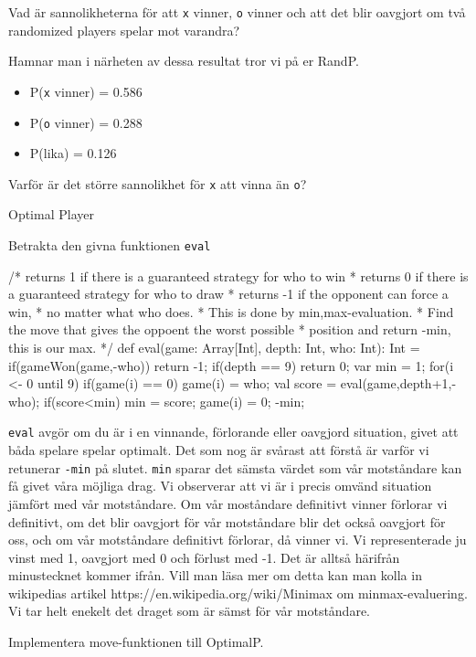 \Subtask Vad är sannolikheterna för att \texttt{x} vinner, \texttt{o} vinner och att det blir oavgjort om två randomized players spelar mot varandra?

Hamnar man i närheten av dessa resultat tror vi på er RandP.
\begin{itemize}
	\item P(\texttt{x} vinner) = 0.586
	\item P(\texttt{o} vinner) = 0.288
	\item P(lika) = 0.126
\end{itemize}

\Subtask Varför är det större sannolikhet för \texttt{x} att vinna än \texttt{o}?

\Task Optimal Player

Betrakta den givna funktionen \texttt{eval}
\begin{Code}
/* returns 1 if there is a guaranteed strategy for who to win 
 * returns 0 if there is a guaranteed strategy for who to draw 
 * returns -1 if the opponent can force a win,
 * no matter what who does.
 * This is done by min,max-evaluation. 
 * Find the move that gives the oppoent the worst possible
 * position and return -min, this is our max.
 */
def eval(game: Array[Int], depth: Int, who: Int): Int = {
	if(gameWon(game,-who)) return -1;
	if(depth == 9) return 0;
	var min = 1;
	for(i <- 0 until 9) {
		if(game(i) == 0) {
			game(i) = who;
			val score = eval(game,depth+1,-who);
			if(score<min){
				min = score;
			}
			game(i) = 0;
		}
	}
	-min;
}
\end{Code}

\texttt{eval} avgör om du är i en vinnande, förlorande eller oavgjord situation, givet att båda spelare spelar optimalt. Det som nog är svårast att förstå är varför vi retunerar \texttt{-min} på slutet. \texttt{min} sparar det sämsta värdet som vår motståndare kan få givet våra möjliga drag. Vi observerar att vi är i precis omvänd situation jämfört med vår motståndare. Om vår moståndare definitivt vinner förlorar vi definitivt, om det blir oavgjort för vår motståndare blir det också oavgjort för oss, och om vår motståndare definitivt förlorar, då vinner vi. Vi representerade ju vinst med 1, oavgjort med 0 och förlust med -1. Det är alltså härifrån minustecknet kommer ifrån. Vill man läsa mer om detta kan man kolla in wikipedias artikel https://en.wikipedia.org/wiki/Minimax om minmax-evaluering. Vi tar helt enekelt det draget som är sämst för vår motståndare.

\Subtask Implementera move-funktionen till OptimalP.

